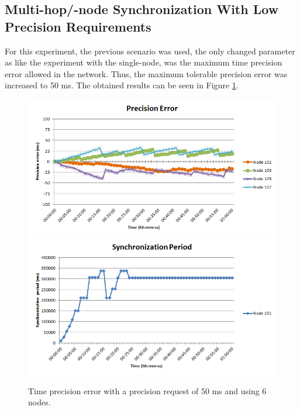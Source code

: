 \clearpage

\subsection{Multi-hop/-node Synchronization With Low Precision Requirements}
For this experiment, the previous scenario was used, the only changed parameter as like the experiment with the single-node, was the maximum time precision error allowed in the network. Thus, the maximum tolerable precision error was increased to 50 ms. The obtained results can be seen in Figure \ref{50ms6nodes}.

\begin{figure}[!htb]
\begin{center}
\includegraphics[scale=0.4]{./images/23-ttsp-50ms6nodes-error.png}
\includegraphics[scale=0.4]{./images/22-ttsp-50ms6nodes-period.png}
\end{center}
\caption{Time precision error with a precision request of 50 ms and using 6 nodes.}
\label{50ms6nodes}
\end{figure}

